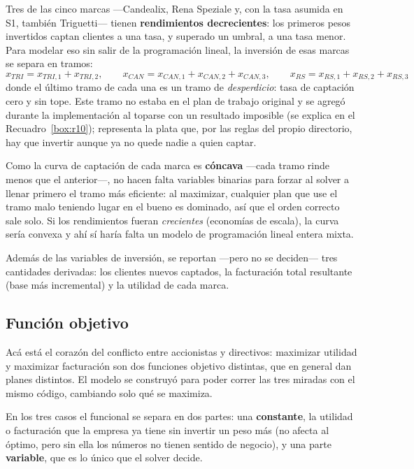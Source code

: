 \documentclass[10pt,a4paper]{article}
\begin{document}
Tres de las cinco marcas —Candealix, Rena Speziale y, con la tasa asumida en
S1, también Triguetti— tienen \textbf{rendimientos decrecientes}: los primeros
pesos invertidos captan clientes a una tasa, y superado un umbral, a una tasa
menor. Para modelar eso sin salir de la programación lineal, la inversión de
esas marcas se separa en tramos:
\[
x_{TRI} = x_{TRI,1} + x_{TRI,2}, \qquad
x_{CAN} = x_{CAN,1} + x_{CAN,2} + x_{CAN,3}, \qquad
x_{RS} = x_{RS,1} + x_{RS,2} + x_{RS,3}
\]
donde el último tramo de cada una es un tramo de \emph{desperdicio}: tasa de
captación cero y sin tope. Este tramo no estaba en el plan de trabajo original
y se agregó durante la implementación al toparse con un resultado imposible
(se explica en el Recuadro~\ref{box:r10}); representa la plata que, por las
reglas del propio directorio, hay que invertir aunque ya no quede nadie a quien
captar.

Como la curva de captación de cada marca es \textbf{cóncava} —cada tramo rinde
menos que el anterior—, no hacen falta variables binarias para forzar al
solver a llenar primero el tramo más eficiente: al maximizar, cualquier plan
que use el tramo malo teniendo lugar en el bueno es dominado, así que el orden
correcto sale solo. Si los rendimientos fueran \emph{crecientes} (economías de
escala), la curva sería convexa y ahí sí haría falta un modelo de programación
lineal entera mixta.

Además de las variables de inversión, se reportan —pero no se deciden—
tres cantidades derivadas: los clientes nuevos captados, la facturación total
resultante (base más incremental) y la utilidad de cada marca.

\subsection{Función objetivo}
\label{sec:objetivo}

Acá está el corazón del conflicto entre accionistas y directivos: maximizar
utilidad y maximizar facturación son dos funciones objetivo distintas, que en
general dan planes distintos. El modelo se construyó para poder correr las
tres miradas con el mismo código, cambiando solo qué se maximiza.

En los tres casos el funcional se separa en dos partes: una \textbf{constante},
la utilidad o facturación que la empresa ya tiene sin invertir un peso más
(no afecta al óptimo, pero sin ella los números no tienen sentido de negocio),
y una parte \textbf{variable}, que es lo único que el solver decide.
\end{document}

